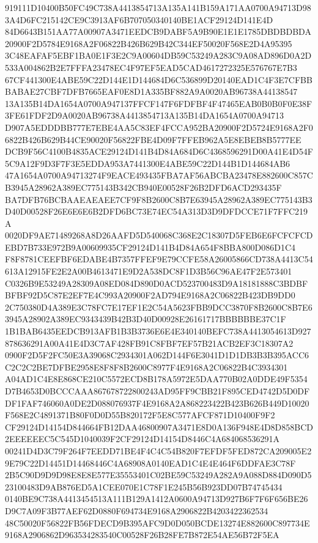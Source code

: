 \documentclass[UTF8,fontset=fandol,zihao=-4,a4paper]{ctexart}
\begin{document}
{{919111D10400B50FC49C738A4413854713A135A141B159A171AA0700A94713D983A4D6FC215142CE9C3913AF6B707050340140BE1ACF29124D141E4D
84D6643B151AA77A00907A3471EEDCB9DABF5A9B90E1E1E1785DBDBDBDA20900F2D5784E9168A2F06822B426B629B42C344EF50020F568E2D4A95395
3C48EAFAF5EBF1BA0E1F3E2C9A00604DB59C53249A283C9A08AD896D0A2D533A004862B2E7FFFA23478EC4F97EF5EAD5CAD4617272325E576767E7B3
67CF441300E4ABE59C22D144E1D144684D6C536899D20140EAD1C4F3E7CFBBBABAE27CBF7DFB7665EAF0E8D1A335BF882A9A0020AB96738A44138547
13A135B14DA1654A0700A947137FFCF147F6FDFBF4F47465EAB0B0B0F0E38F3FE61FDF2D9A0020AB96738A4413854713A135B14DA1654A0700A94713
D907A5EDDDBB777E7EBE4AA5C83EF4FCCA952BA20900F2D5724E9168A2F06822B426B629B44CE90020F56822FBE4D09F7FFEB962A5E8EBEB8B5777EE
DCB9F56C4100B4835ACE29124D141B4D84A684D6C4368596291D00A41E4D54F5C9A12F9D3F7F3E5EDDA953A7441300E4ABE59C22D144B1D144684AB6
47A1654A0700A94713274F9EACE493435FBA7AF56ABCBA23478E882600C857CB3945A28962A389EC775143B342CB940E00528F26B2DFD6ACD293435F
BA7DFB76BCBAAEAEAEE7CF9F8B2600C8B7E63945A28962A389EC775143B3D40D00528F26E6E6E6B2DFD6BC73E74EC54A313D3D9DFDCCE71F7FFC219A
0020DF9AE71489268A8D26AAFD5D540068C368E2C18307D5FEB6E6FCFCFCDEBD7B733E972B9A00609935CF29124D141B4D84A654F8BBA800D086D1C4
F8F8781CEEFBF6EDABE4B7357FFEF9E79CCFE58A26005866CD738A4413C54613A12915FE2E2A00B4613471E9D2A538DC8F1D3B56C96AE47F2E573401
C0326B9E53249A28309A08ED084D890D0ACD523700483D9A18181888C3BDBFBFBF92D5C87E2EF7E4C993A20900F2AD794E9168A2C06822B423DB9DD0
2C750380D4A389E3C78FC7E17EF1E2C54A5623FBB9DCC3870F8B2600C8B7E63945A28902A389EC9343439B42B3D40D00928E26161717BBBBBBE37C1F
1B1BAB6435EEDCB913AFB1B3B3736E6E4E340140BEFC738A4413054613D927878636291A00A41E4D3C7AF428FB91C8FBF7EF57B21ACB2EF3C18307A2
0900F2D5F2FC50E3A39068C2934301A062D144F6E3041D1D1DB3B3B395ACC6C2C2C2BE7DFBE2958E8F8F8B2600C8977F4E9168A2C06822B4C3934301
A04AD1C4E8E868CE210C5572ECD8B178A5972E5DAA770B02A0DDE49F5354D7B4653D0BCCCAAA867678722800243AD95FF9CBB21F895CED4742D5D0DF
DF1FAF746060A0DE2D088076937F4E9168A2A868223422B423B626B449D10020F568E2C4891371B80F0D0D55B820172F5E8C577AFCF871D10400F9F2
CF29124D14154D844664FB12DAA46800907A3471E8D0A136F948E4D8D858BCD2EEEEEEC5C545D1040039F2CF29124D14154D8446C4A684068536291A
00241D4D3C79F264F7EEDD71BE4F4C4C54B820F7EFDF5FED872CA209005E29E79C22D14451D14468446C4A68908A0140EAD1C4E4E464F6DDFAE3C78F
2B5C90D9D9D98E8E8E577E35553401C02BE59C53249A282A9A088D884D090D523100483D9AB876ED5A1CEE070E1C78F1E245B56B923DD07B74745434
0140BE9C738A4413454513A111B129A1412A0600A94713D927B6F7F6F656BE26D9C7A09F3B77AEF62D0880F694734E9168A2906822B4203422362534
48C50020F56822FB56FDECD9B395AFC9D0D050BCDE13274E882600C897734E9168A2906862D963534283540C00528F26B28FE7B872E54AE56B72F5EA
}}
\end{document}
